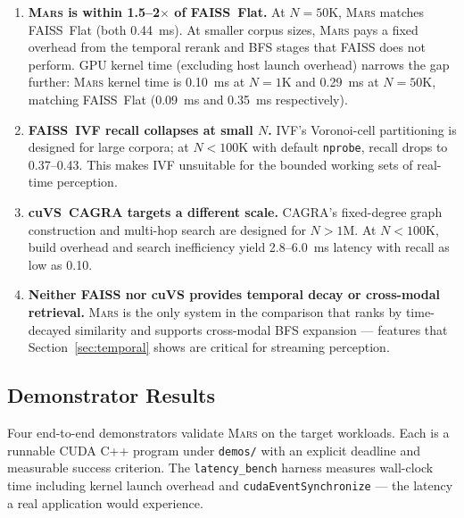 \documentclass[11pt]{article}
\newcommand{\mars}{\textsc{Mars}}
\begin{document}
\begin{enumerate}
\item \textbf{\mars{} is within 1.5--2$\times$ of FAISS~Flat.} At
  $N{=}50$K, \mars{} matches FAISS~Flat (both 0.44~ms). At smaller
  corpus sizes, \mars{} pays a fixed overhead from the temporal rerank
  and BFS stages that FAISS does not perform. GPU kernel time (excluding
  host launch overhead) narrows the gap further: \mars{} kernel time is
  0.10~ms at $N{=}1$K and 0.29~ms at $N{=}50$K, matching FAISS~Flat
  (0.09~ms and 0.35~ms respectively).

\item \textbf{FAISS~IVF recall collapses at small $N$.} IVF's
  Voronoi-cell partitioning is designed for large corpora; at
  $N < 100$K with default \texttt{nprobe}, recall drops to 0.37--0.43.
  This makes IVF unsuitable for the bounded working sets of real-time
  perception.

\item \textbf{cuVS~CAGRA targets a different scale.} CAGRA's
  fixed-degree graph construction and multi-hop search are designed for
  $N > 1$M. At $N < 100$K, build overhead and search inefficiency
  yield 2.8--6.0~ms latency with recall as low as 0.10.

\item \textbf{Neither FAISS nor cuVS provides temporal decay or
  cross-modal retrieval.} \mars{} is the only system in the comparison
  that ranks by time-decayed similarity and supports cross-modal BFS
  expansion --- features that Section~\ref{sec:temporal} shows are
  critical for streaming perception.
\end{enumerate}

\subsection{Demonstrator Results}
\label{sec:demos}

Four end-to-end demonstrators validate \mars{} on the target workloads.
Each is a runnable CUDA C++ program under \texttt{demos/} with an
explicit deadline and measurable success criterion. The
\texttt{latency\_bench} harness measures wall-clock time including
kernel launch overhead and \texttt{cudaEventSynchronize} --- the
latency a real application would experience.
\end{document}
